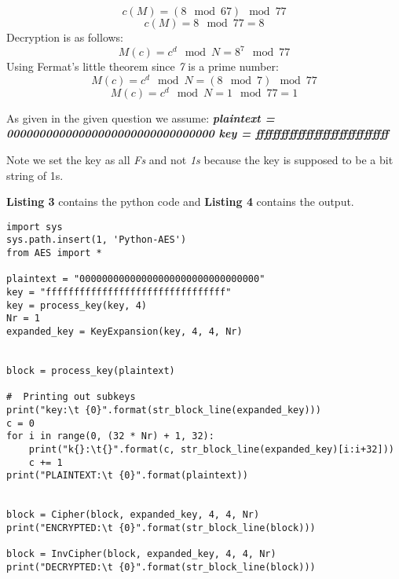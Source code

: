 \documentclass[10pt,a4paper,oneside]{article}
\begin{document}
\begin{enumerate}
\begin{equation}
c(M) = (8 \mod 67) \mod 77 
\end{equation}
\begin{equation}
c(M) = 8 \mod 77  = 8
\end{equation}
Decryption is as follows:
\begin{equation}
M(c) = c^d \mod N = 8 ^ {7} \mod 77 
\end{equation}
Using Fermat's little theorem since \textit{7} is a prime number:
\begin{equation}
M(c) = c^d \mod N = (8 \mod 7 )\mod 77 
\end{equation}
\begin{equation}
M(c) = c^d \mod N = 1 \mod 77  = 1
\end{equation}
\end{enumerate}
As given in the given question we assume:\newline
\textit{
\textbf{
plaintext = 00000000000000000000000000000000\newline
key = ffffffffffffffffffffffffffffffff\newline
}
}
\newline

Note we set the key as all \textit{Fs} and not \textit{1s} because the key is supposed to be a bit string of 1s.

\textbf{Listing 3} contains the python code and \textbf{Listing 4} contains the output.

\lstset{showstringspaces=false}
\begin{lstlisting}
import sys
sys.path.insert(1, 'Python-AES')
from AES import *

plaintext = "00000000000000000000000000000000"
key = "ffffffffffffffffffffffffffffffff"
key = process_key(key, 4)
Nr = 1
expanded_key = KeyExpansion(key, 4, 4, Nr)


block = process_key(plaintext)

#  Printing out subkeys
print("key:\t {0}".format(str_block_line(expanded_key)))
c = 0
for i in range(0, (32 * Nr) + 1, 32):
    print("k{}:\t{}".format(c, str_block_line(expanded_key)[i:i+32]))
    c += 1
print("PLAINTEXT:\t {0}".format(plaintext))


block = Cipher(block, expanded_key, 4, 4, Nr)
print("ENCRYPTED:\t {0}".format(str_block_line(block)))

block = InvCipher(block, expanded_key, 4, 4, Nr)
print("DECRYPTED:\t {0}".format(str_block_line(block)))
\end{lstlisting}
\end{document}
